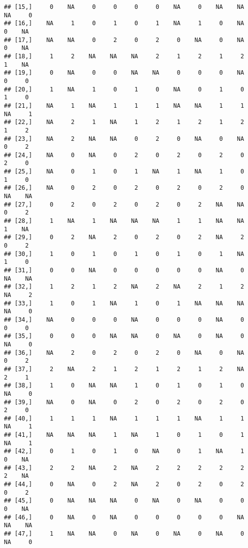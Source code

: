 \documentclass[
]{article}
\begin{document}
\begin{verbatim}
## [15,]     0    NA     0     0     0     0    NA     0    NA    NA    NA     0
## [16,]    NA     1     0     1     0     1    NA     1     0    NA     0    NA
## [17,]    NA    NA     0     2     0     2     0    NA     0    NA     0    NA
## [18,]     1     2    NA    NA    NA     2     1     2     1     2     1    NA
## [19,]     0    NA     0     0    NA    NA     0     0     0    NA     0     0
## [20,]     1    NA     1     0     1     0    NA     0     1     0     1     0
## [21,]    NA     1    NA     1     1     1    NA    NA     1     1    NA     1
## [22,]    NA     2     1    NA     1     2     1     2     1     2     1     2
## [23,]    NA     2    NA    NA     0     2     0    NA     0    NA     0     2
## [24,]    NA     0    NA     0     2     0     2     0     2     0     2     0
## [25,]    NA     0     1     0     1    NA     1    NA     1     0     1     0
## [26,]    NA     0     2     0     2     0     2     0     2     0    NA    NA
## [27,]     0     2     0     2     0     2     0     2    NA    NA     0     2
## [28,]     1    NA     1    NA    NA    NA     1     1    NA    NA     1    NA
## [29,]     0     2    NA     2     0     2     0     2    NA     2     0     2
## [30,]     1     0     1     0     1     0     1     0     1    NA     1     0
## [31,]     0     0    NA     0     0     0     0     0    NA     0    NA    NA
## [32,]     1     2     1     2    NA     2    NA     2     1     2    NA     2
## [33,]     1     0     1    NA     1     0     1    NA    NA    NA    NA     0
## [34,]    NA     0     0     0    NA     0     0     0    NA     0     0     0
## [35,]     0     0     0    NA    NA     0    NA     0    NA     0    NA     0
## [36,]    NA     2     0     2     0     2     0    NA     0    NA     0     2
## [37,]     2    NA     2     1     2     1     2     1     2    NA     2     1
## [38,]     1     0    NA    NA     1     0     1     0     1     0    NA     0
## [39,]    NA     0    NA     0     2     0     2     0     2     0     2     0
## [40,]     1     1     1    NA     1     1     1    NA     1     1    NA     1
## [41,]    NA    NA    NA     1    NA     1     0     1     0     1    NA     1
## [42,]     0     1     0     1     0    NA     0     1    NA     1     0    NA
## [43,]     2     2    NA     2    NA     2     2     2     2     2     2    NA
## [44,]     0    NA     0     2    NA     2     0     2     0     2     0     2
## [45,]     0    NA    NA    NA     0    NA     0    NA     0     0     0    NA
## [46,]     0    NA     0    NA     0     0     0     0     0    NA    NA    NA
## [47,]     1    NA    NA     0    NA     0    NA     0    NA     0    NA     0

\end{verbatim}
\end{document}
